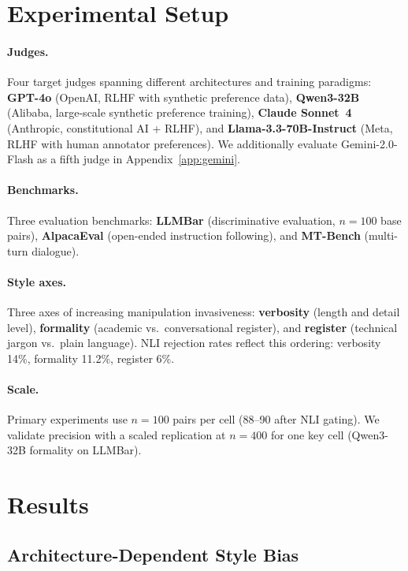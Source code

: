 \documentclass[11pt]{article}
\begin{document}
\section{Experimental Setup}

\paragraph{Judges.} Four target judges spanning different architectures and training paradigms: \textbf{GPT-4o} (OpenAI, RLHF with synthetic preference data), \textbf{Qwen3-32B} (Alibaba, large-scale synthetic preference training), \textbf{Claude Sonnet~4} (Anthropic, constitutional AI + RLHF), and \textbf{Llama-3.3-70B-Instruct} (Meta, RLHF with human annotator preferences). We additionally evaluate Gemini-2.0-Flash as a fifth judge in Appendix~\ref{app:gemini}.

\paragraph{Benchmarks.} Three evaluation benchmarks: \textbf{LLMBar} \cite{zeng2024llmbar} (discriminative evaluation, $n=100$ base pairs), \textbf{AlpacaEval} \cite{dubois2024alpacafarm} (open-ended instruction following), and \textbf{MT-Bench} \cite{zheng2024judging} (multi-turn dialogue).

\paragraph{Style axes.} Three axes of increasing manipulation invasiveness: \textbf{verbosity} (length and detail level), \textbf{formality} (academic vs.\ conversational register), and \textbf{register} (technical jargon vs.\ plain language). NLI rejection rates reflect this ordering: verbosity 14\%, formality 11.2\%, register 6\%.

\paragraph{Scale.} Primary experiments use $n=100$ pairs per cell (88--90 after NLI gating). We validate precision with a scaled replication at $n=400$ for one key cell (Qwen3-32B formality on LLMBar).

\section{Results}

\subsection{Architecture-Dependent Style Bias}
\label{sec:main_results}
\end{document}
